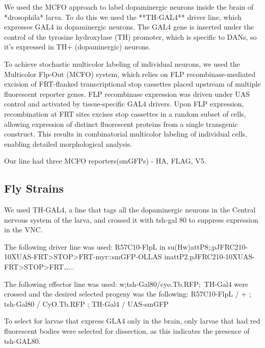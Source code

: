 We used the MCFO approach to label dopaminergic neurons inside the brain of *drosophila* larva. To do this we used the **TH-GAL4** driver line, which expresses GAL4 in dopaminergic neurons. The GAL4 gene is inserted under the control of the tyrosine hydroxylase (TH) promoter, which is specific to DANs, so it’s expressed in TH+ (dopaminergic) neurons.


To achieve stochastic multicolor labeling of individual neurons, we used the Multicolor Flp-Out (MCFO) system, which relies on FLP recombinase-mediated excision of FRT-flanked transcriptional stop cassettes placed upstream of multiple fluorescent reporter genes. FLP recombinase expression was driven under UAS control and activated by tissue-specific GAL4 drivers. Upon FLP expression, recombination at FRT sites excises stop cassettes in a random subset of cells, allowing expression of distinct fluorescent proteins from a single transgenic construct. This results in combinatorial multicolor labeling of individual cells, enabling detailed morphological analysis.

Our line had three MCFO reporters(smGFPs) - HA, FLAG, V5.

\subsection{Fly Strains}
We used TH-GAL4, a line that tags all the dopaminergic neurons in the Central nervous system of the larva, and crossed it with tsh-gal 80 to suppress expression in the VNC. 

The following driver line was used:
R57C10-FlpL in su(Hw)attP8;;pJFRC210-10XUAS-FRT>STOP>FRT-myr::smGFP-OLLAS inattP2.pJFRC210-10XUAS-FRT>STOP>FRT…...

The following effector line was used:
w;tsh-Gal80/cyo.Tb.RFP; TH-Gal4
were crossed and the desired selected progeny was the following:
R57C10-FlpL / + ; tsh-Gal80 / CyO.Tb.RFP ; TH-Gal4 / UAS-smGFP


To select for larvae that express GLA4 only in the brain, only larvae that had red fluorescent bodies were selected for dissection, as this indicates the presence of tsh-GAL80.


